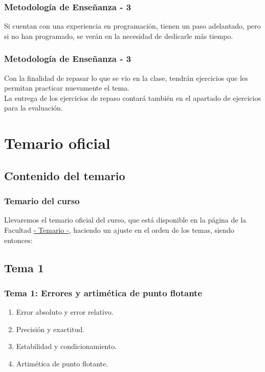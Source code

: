 \documentclass[12pt]{beamer}
\begin{document}
\begin{frame}
\frametitle{Metodología de Enseñanza - 3}
Si cuentan con una experiencia en programación, tienen un paso adelantado, pero si no han programado, se verán en la necesidad de dedicarle más tiempo.
\end{frame}
\begin{frame}
\frametitle{Metodología de Enseñanza - 3}
Con la finalidad de repasar lo que se vio en la clase, tendrán ejercicios que les permitan practicar nuevamente el tema.
\\
\bigskip
\pause
La entrega de los ejercicios de repaso contará también en el apartado de ejercicios para la evaluación.
\end{frame}

\section{Temario oficial}
\subsection{Contenido del temario}

\begin{frame}
\frametitle{Temario del curso}
Llevaremos el temario oficial del curso, que está disponible en la página de la Facultad \href{http://www.fciencias.unam.mx/asignaturas/715.pdf}{- Temario -}, haciendo un ajuste en el orden de los temas, siendo entonces:
\end{frame}

\subsection*{Tema 1}

\begin{frame}
\frametitle{\textbf{Tema 1: Errores y artimética de punto flotante}}
\begin{enumerate}[<+->]
\item Error absoluto y error relativo.
\item Precisión y exactitud.
\item Estabilidad y condicionamiento.
\item Artimética de punto flotante.
\end{enumerate}
\end{frame}
\end{document}
